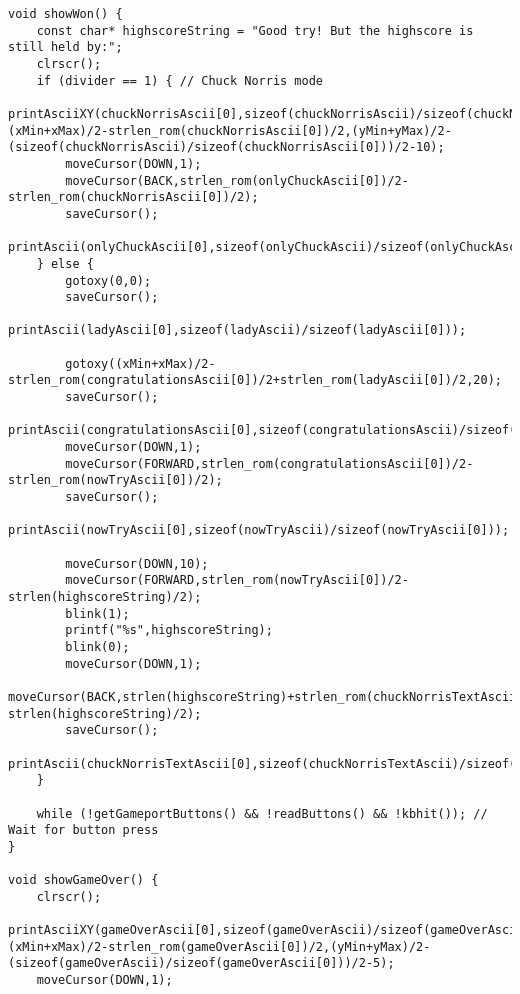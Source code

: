 \begin{lstlisting}
void showWon() {
	const char* highscoreString = "Good try! But the highscore is still held by:";
	clrscr();
	if (divider == 1) { // Chuck Norris mode		
		printAsciiXY(chuckNorrisAscii[0],sizeof(chuckNorrisAscii)/sizeof(chuckNorrisAscii[0]),(xMin+xMax)/2-strlen_rom(chuckNorrisAscii[0])/2,(yMin+yMax)/2-(sizeof(chuckNorrisAscii)/sizeof(chuckNorrisAscii[0]))/2-10);
		moveCursor(DOWN,1);
		moveCursor(BACK,strlen_rom(onlyChuckAscii[0])/2-strlen_rom(chuckNorrisAscii[0])/2);
		saveCursor();
		printAscii(onlyChuckAscii[0],sizeof(onlyChuckAscii)/sizeof(onlyChuckAscii[0]));
	} else {
		gotoxy(0,0);
		saveCursor();
		printAscii(ladyAscii[0],sizeof(ladyAscii)/sizeof(ladyAscii[0]));

		gotoxy((xMin+xMax)/2-strlen_rom(congratulationsAscii[0])/2+strlen_rom(ladyAscii[0])/2,20);		
		saveCursor();
		printAscii(congratulationsAscii[0],sizeof(congratulationsAscii)/sizeof(congratulationsAscii[0]));
		moveCursor(DOWN,1);
		moveCursor(FORWARD,strlen_rom(congratulationsAscii[0])/2-strlen_rom(nowTryAscii[0])/2);
		saveCursor();
		printAscii(nowTryAscii[0],sizeof(nowTryAscii)/sizeof(nowTryAscii[0]));
		
		moveCursor(DOWN,10);
		moveCursor(FORWARD,strlen_rom(nowTryAscii[0])/2-strlen(highscoreString)/2);
		blink(1);
		printf("%s",highscoreString);
		blink(0);
		moveCursor(DOWN,1);
		moveCursor(BACK,strlen(highscoreString)+strlen_rom(chuckNorrisTextAscii[0])/2-strlen(highscoreString)/2);
		saveCursor();
		printAscii(chuckNorrisTextAscii[0],sizeof(chuckNorrisTextAscii)/sizeof(chuckNorrisTextAscii[0]));
	}

	while (!getGameportButtons() && !readButtons() && !kbhit()); // Wait for button press
}

void showGameOver() {
	clrscr();
	printAsciiXY(gameOverAscii[0],sizeof(gameOverAscii)/sizeof(gameOverAscii[0]),(xMin+xMax)/2-strlen_rom(gameOverAscii[0])/2,(yMin+yMax)/2-(sizeof(gameOverAscii)/sizeof(gameOverAscii[0]))/2-5);
	moveCursor(DOWN,1);
	

\end{lstlisting}
